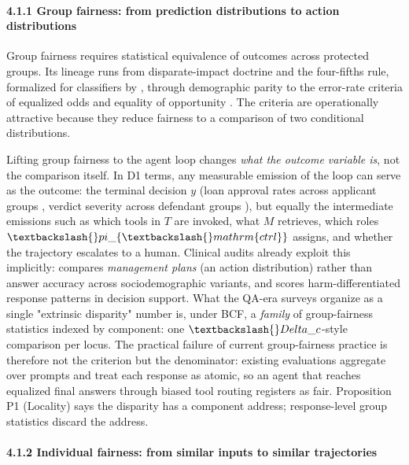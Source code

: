 \documentclass[10pt]{article}
\begin{document}
\paragraph*{4.1.1 Group fairness: from prediction distributions to action distributions}

Group fairness requires statistical equivalence of outcomes across protected groups. Its lineage runs from disparate-impact doctrine and the four-fifths rule, formalized for classifiers by \cite{feldman2015certifying}, through demographic parity to the error-rate criteria of equalized odds and equality of opportunity \cite{hardt2016equality}. The criteria are operationally attractive because they reduce fairness to a comparison of two conditional distributions.

Lifting group fairness to the agent loop changes \emph{what the outcome variable is}, not the comparison itself. In D1 terms, any measurable emission of the loop can serve as the outcome: the terminal decision $y$ (loan approval rates across applicant groups \cite{azime2025accept}, verdict severity across defendant groups \cite{hu2025llms}), but equally the intermediate emissions such as which tools in $T$ are invoked, what $M$ retrieves, which roles $\textbackslash\{\}pi\_\{\textbackslash\{\}mathrm\{ctrl\}\}$ assigns, and whether the trajectory escalates to a human. Clinical audits already exploit this implicitly: \cite{omar2025sociodemographic} compares \emph{management plans} (an action distribution) rather than answer accuracy across sociodemographic variants, and \cite{adappanavar2025mfarm} scores harm-differentiated response patterns in decision support. What the QA-era surveys organize as a single "extrinsic disparity" number \cite{gallegos2024bias,chu2024fairness} is, under BCF, a \emph{family} of group-fairness statistics indexed by component: one $\textbackslash\{\}Delta\_c$-style comparison per locus. The practical failure of current group-fairness practice is therefore not the criterion but the denominator: existing evaluations aggregate over prompts and treat each response as atomic, so an agent that reaches equalized final answers through biased tool routing registers as fair. Proposition P1 (Locality) says the disparity has a component address; response-level group statistics discard the address.

\paragraph*{4.1.2 Individual fairness: from similar inputs to similar trajectories}
\end{document}
